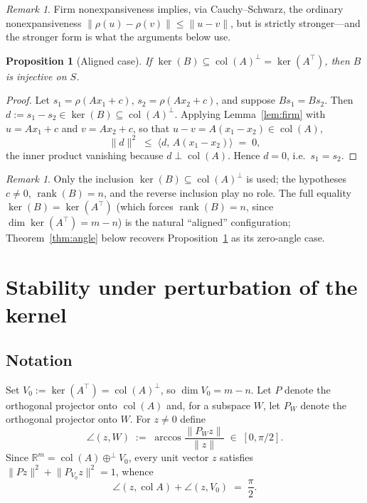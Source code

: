\documentclass[11pt]{article}
\numberwithin{equation}{section}
\newtheorem{proposition}[theorem]{Proposition}
\theoremstyle{remark}
\newtheorem{remark}[theorem]{Remark}
\newcommand{\R}{\mathbb{R}}
\DeclareMathOperator{\col}{col}
\DeclareMathOperator{\rank}{rank}
\newcommand{\norm}[1]{\lVert #1\rVert}
\newcommand{\ip}[2]{\langle #1,\,#2\rangle}
\begin{document}
\begin{remark}
Firm nonexpansiveness implies, via Cauchy--Schwarz, the ordinary nonexpansiveness $\norm{\rho(u)-\rho(v)}\le\norm{u-v}$, but is strictly stronger---and the stronger form is what the arguments below use.
\end{remark}
\newpage
\begin{proposition}[Aligned case]\label{prop:aligned}
If $\ker(B)\subseteq\col(A)^{\perp}=\ker(A^{\top})$, then $B$ is injective on $S$.
\end{proposition}

\begin{proof}
Let $s_1=\rho(Ax_1+c)$, $s_2=\rho(Ax_2+c)$, and suppose $Bs_1=Bs_2$. Then $d:=s_1-s_2\in\ker(B)\subseteq\col(A)^{\perp}$. Applying Lemma~\ref{lem:firm} with $u=Ax_1+c$ and $v=Ax_2+c$, so that $u-v=A(x_1-x_2)\in\col(A)$,
\[
\norm{d}^2\;\le\;\ip{d}{A(x_1-x_2)}\;=\;0 ,
\]
the inner product vanishing because $d\perp\col(A)$. Hence $d=0$, i.e.\ $s_1=s_2$.
\end{proof}

\begin{remark}\label{rem:hypotheses}
Only the inclusion $\ker(B)\subseteq\col(A)^{\perp}$ is used; the hypotheses $c\ne 0$, $\rank(B)=n$, and the reverse inclusion play no role. The full equality $\ker(B)=\ker(A^{\top})$ (which forces $\rank(B)=n$, since $\dim\ker(A^{\top})=m-n$) is the natural ``aligned'' configuration; Theorem~\ref{thm:angle} below recovers Proposition~\ref{prop:aligned} as its zero-angle case.
\end{remark}

\section{Stability under perturbation of the kernel}\label{sec:stability}

\subsection{Notation}

Set $V_0:=\ker(A^{\top})=\col(A)^{\perp}$, so $\dim V_0=m-n$. Let $P$ denote the orthogonal projector onto $\col(A)$ and, for a subspace $W$, let $P_W$ denote the orthogonal projector onto $W$. For $z\ne 0$ define
\[
\angle(z,W)\;:=\;\arccos\frac{\norm{P_W z}}{\norm{z}}\;\in\;[0,\pi/2].
\]
Since $\R^m=\col(A)\oplus^{\perp}V_0$, every unit vector $z$ satisfies $\norm{Pz}^2+\norm{P_{V_0}z}^2=1$, whence
\begin{equation}\label{eq:complementary}
\angle(z,\col A)+\angle(z,V_0)\;=\;\frac{\pi}{2}.
\end{equation}
\end{document}
